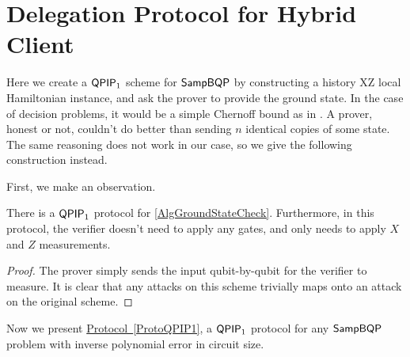 \section{Delegation Protocol for Hybrid Client}


Here we create a $\operatorname{\mathsf{QPIP}}_1$ scheme for $\operatorname{\mathsf{SampBQP}}$ by constructing a history XZ local Hamiltonian instance, and ask the prover to provide the ground state. In the case of decision problems, it would be a simple Chernoff bound as in \cite{kitaev2002classical}. A prover, honest or not, couldn't do better than sending $n$ identical copies of some state. The same reasoning does not work in our case, so we give the following construction instead.

First, we make an observation.

\begin{observation}
	\label{ProtoGroundStateCheck}
	There is a $\operatorname{\mathsf{QPIP}}_1$ protocol for \autoref{AlgGroundStateCheck}. Furthermore, in this protocol, the verifier doesn't need to apply any gates, and only needs to apply $X$ and $Z$ measurements.
\end{observation}
\begin{proof}
	The prover simply sends the input qubit-by-qubit for the verifier to measure. It is clear that any attacks on this scheme trivially maps onto an attack on the original scheme.
\end{proof}

Now we present \hyperref[ProtoQPIP1]{Protocol~\ref*{ProtoQPIP1}}, a $\operatorname{\mathsf{QPIP}}_1$ protocol for any $\operatorname{\mathsf{SampBQP}}$ problem with inverse polynomial error in circuit size.

